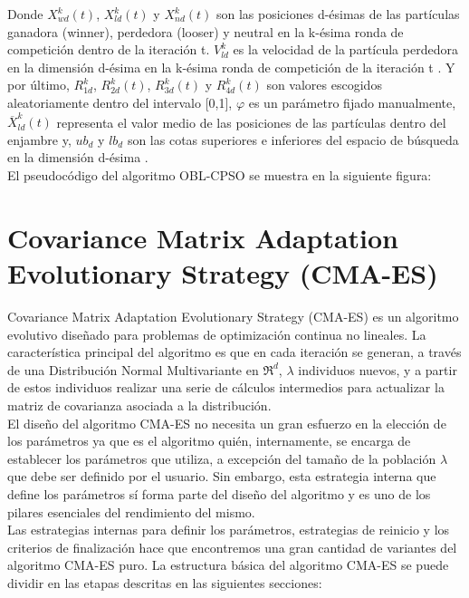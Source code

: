 Donde $X^{k}_{wd}(t)$, $ X^{k}_{ld}(t)$ y $ X^{k}_{nd}(t)$ son las posiciones d-ésimas de las partículas ganadora (winner), perdedora (looser) y neutral en la k-ésima ronda de competición dentro de la iteración t. $V^{k}_{ld}$ es la velocidad de la partícula perdedora en la dimensión d-ésima en la k-ésima ronda de competición de la iteración t \cite{oblcpso}. Y por último, $R^{k}_{1d}$, $R^{k}_{2d}(t)$, $R^{k}_{3d}(t)$ y $R^{k}_{4d}(t)$ son valores escogidos aleatoriamente dentro del intervalo [0,1], $\varphi$ es un parámetro fijado manualmente, $\overline{X}^{k}_{ld}(t)$ representa el valor medio de las posiciones de las partículas dentro del enjambre y, $ub_{d}$ y $lb_{d}$ son las cotas superiores e inferiores del espacio de búsqueda en la dimensión d-ésima \cite{oblcpso}. \\
El pseudocódigo del algoritmo OBL-CPSO se muestra en la siguiente figura: 



\section{Covariance Matrix Adaptation Evolutionary Strategy (CMA-ES)}
\label{sec:CMA}

Covariance Matrix Adaptation Evolutionary Strategy (CMA-ES) \cite{CMA} es un algoritmo evolutivo diseñado para problemas de optimización continua no lineales. 
La característica principal del algoritmo es que en cada iteración se generan, a través de una Distribución Normal Multivariante en $\Re^{d}$, $\lambda$ individuos nuevos, y a partir de estos individuos realizar una serie de cálculos intermedios para actualizar la matriz de covarianza asociada a la distribución. \\  
El diseño del algoritmo CMA-ES no necesita un gran esfuerzo en la elección de los parámetros ya que es el algoritmo quién, internamente, se encarga de establecer los parámetros que utiliza, a excepción del tamaño de la población $\lambda$ que debe ser definido por el usuario. Sin embargo, esta estrategia interna que define los parámetros sí forma parte del diseño del algoritmo y es uno de los pilares esenciales del rendimiento del mismo. \\

Las estrategias internas para definir los parámetros, estrategias de reinicio y los criterios de finalización hace que encontremos una gran cantidad de variantes del algoritmo CMA-ES puro. La estructura básica del algoritmo CMA-ES se puede dividir en las etapas descritas en las siguientes secciones: \\ 

